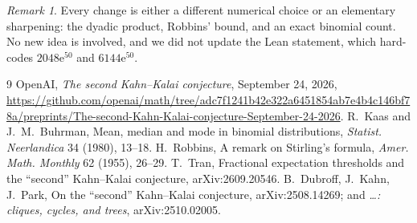 \documentclass[11pt]{amsart}
\theoremstyle{remark}
\newtheorem{remark}[theorem]{Remark}
\newcommand{\ee}{\mathrm e}
\begin{document}
\begin{remark}
Every change is either a different numerical choice or an elementary
sharpening: the dyadic product, Robbins' bound, and an exact binomial count.
No new idea is involved, and we did not update the Lean statement, which
hard-codes $2048\ee^{50}$ and $6144\ee^{50}$.
\end{remark}

\begin{thebibliography}{9}
 OpenAI, \emph{The second Kahn--Kalai conjecture}, September 24, 2026,
\url{https://github.com/openai/math/tree/adc7f1241b42e322a6451854ab7e4b4c146bf78a/preprints/The-second-Kahn-Kalai-conjecture-September-24-2026}.
 R.~Kaas and J.~M.~Buhrman, Mean, median and mode in binomial distributions,
\emph{Statist. Neerlandica} 34 (1980), 13--18.
 H.~Robbins, A remark on Stirling's formula, \emph{Amer. Math. Monthly} 62 (1955), 26--29.
 T.~Tran, Fractional expectation thresholds and the ``second'' Kahn--Kalai conjecture, arXiv:2609.20546.
 B.~Dubroff, J.~Kahn, J.~Park, On the ``second'' Kahn--Kalai conjecture, arXiv:2508.14269; and \emph{\ldots: cliques, cycles, and trees}, arXiv:2510.02005.
\end{thebibliography}
\end{document}

